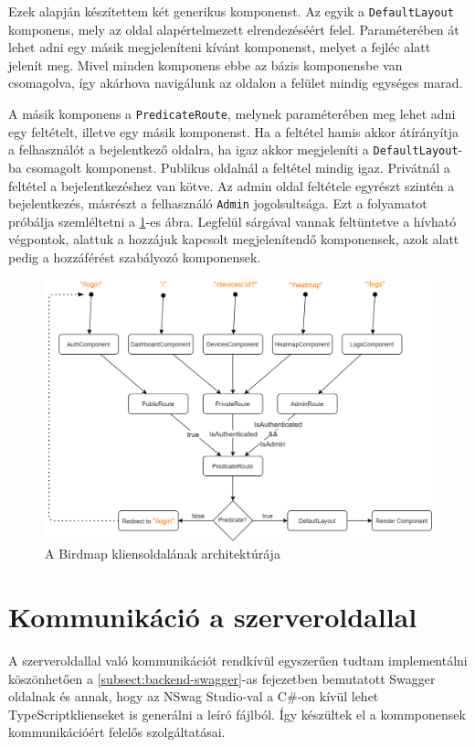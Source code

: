 Ezek alapján készítettem két generikus komponenst. Az egyik a \verb+DefaultLayout+ komponens, mely az oldal alapértelmezett elrendezéséért felel.
Paraméterében át lehet adni egy másik megjeleníteni kívánt komponenst, melyet a fejléc alatt jelenít meg.
Mivel minden komponens ebbe az bázis komponensbe van csomagolva, így akárhova navigálunk az oldalon a felület mindig egységes marad.

A másik komponens a \verb+PredicateRoute+, melynek paraméterében meg lehet adni egy feltételt, illetve egy másik komponenst.
Ha a feltétel hamis akkor átírányítja a felhasználót a bejelentkező oldalra, ha igaz akkor megjeleníti a \verb+DefaultLayout+-ba csomagolt komponenst.
Publikus oldalnál a feltétel mindig igaz. 
Privátnál a feltétel a bejelentkezéshez van kötve. 
Az admin oldal feltétele egyrészt szintén a bejelentkezés, másrészt a felhasználó \verb+Admin+ jogolsultsága.
Ezt a folyamatot próbálja szemléltetni a \ref{fig:birdmap-frontend-architecture}-es ábra. 
Legfelül sárgával vannak feltüntetve a hívható végpontok, alattuk a hozzájuk kapcsolt megjelenítendő komponensek, azok alatt pedig a hozzáférést szabályozó komponensek.

\begin{figure}[!ht]
    \centering
    \includegraphics[width=150mm, keepaspectratio]{figures/birdmap-frontend-routes.png}
    \caption{A Birdmap kliensoldalának architektúrája}
    \label{fig:birdmap-frontend-architecture}
\end{figure}

\section{Kommunikáció a szerveroldallal}
A szerveroldallal való kommunikációt rendkívül egyszerűen tudtam implementálni köszönhetően a \ref{subsect:backend-swagger}-as fejezetben bemutatott Swagger oldalnak
és annak, hogy az NSwag Studio-val\cite{nswag-studio} a C\#-on kívül lehet TypeScript\footnotemark klienseket is generálni a leíró fájlból.
Így készültek el a kommponensek kommunikációért felelős szolgáltatásai.

